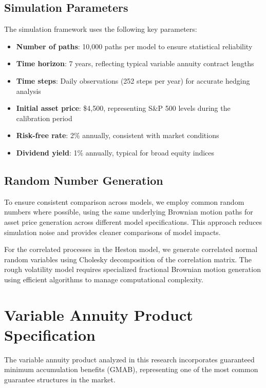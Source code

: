 \documentclass[12pt,a4paper]{report}
\begin{document}
\subsection{Simulation Parameters}

The simulation framework uses the following key parameters:

\begin{itemize}
\item \textbf{Number of paths}: 10,000 paths per model to ensure statistical reliability
\item \textbf{Time horizon}: 7 years, reflecting typical variable annuity contract lengths  
\item \textbf{Time steps}: Daily observations (252 steps per year) for accurate hedging analysis
\item \textbf{Initial asset price}: \$4,500, representing S\&P 500 levels during the calibration period
\item \textbf{Risk-free rate}: 2\% annually, consistent with market conditions
\item \textbf{Dividend yield}: 1\% annually, typical for broad equity indices
\end{itemize}

\subsection{Random Number Generation}

To ensure consistent comparison across models, we employ common random numbers where possible, using the same underlying Brownian motion paths for asset price generation across different model specifications. This approach reduces simulation noise and provides cleaner comparisons of model impacts.

For the correlated processes in the Heston model, we generate correlated normal random variables using Cholesky decomposition of the correlation matrix. The rough volatility model requires specialized fractional Brownian motion generation using efficient algorithms to manage computational complexity.

\section{Variable Annuity Product Specification}

The variable annuity product analyzed in this research incorporates guaranteed minimum accumulation benefits (GMAB), representing one of the most common guarantee structures in the market.
\end{document}
